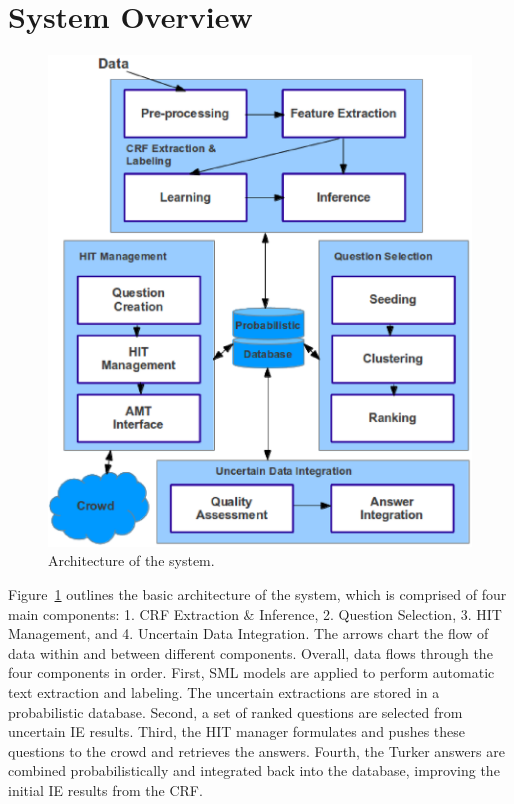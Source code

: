\section{System Overview}
\label{sec:system}

\begin{figure}[t]
        \centering
        \includegraphics[width=.9\textwidth]{architecture.eps}
        \caption{Architecture of the \sysName system.}
        \label{fig:system}
\end{figure}

Figure~\ref{fig:system} outlines the basic architecture of the \sysName system, which is comprised of four main components: 1. CRF Extraction \& Inference, 2. Question Selection, 3. HIT Management, and 4. Uncertain Data Integration. The arrows chart the flow of data within and between different components. Overall, data flows through the four components in order. First, SML models are applied to perform automatic text extraction and labeling. The uncertain extractions are stored in a probabilistic database. Second, a set of ranked questions are selected from uncertain IE results. Third, the HIT manager formulates and pushes these questions to the crowd and retrieves the answers. Fourth, the Turker answers are combined probabilistically and integrated back into the database, improving the initial IE results from the CRF.

